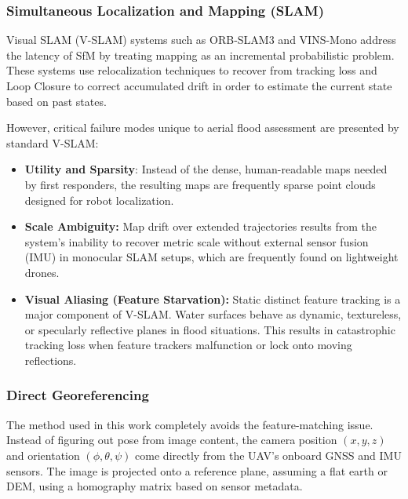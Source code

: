 \documentclass[conference]{IEEEtran}
\begin{document}
\subsubsection{Simultaneous Localization and Mapping (SLAM)}
Visual SLAM (V-SLAM) systems such as ORB-SLAM3\cite{orbslam3} and VINS-Mono\cite{vinsmono} address the latency of SfM by treating mapping as an incremental probabilistic problem. These systems use relocalization techniques to recover from tracking loss and Loop Closure to correct accumulated drift in order to estimate the current state based on past states.

However, critical failure modes unique to aerial flood assessment are presented by standard V-SLAM:
\begin{itemize} \item \textbf{Utility and Sparsity}: Instead of the dense, human-readable maps needed by first responders, the resulting maps are frequently sparse point clouds designed for robot localization.
    \item \textbf{Scale Ambiguity:} Map drift over extended trajectories results from the system's inability to recover metric scale without external sensor fusion (IMU) in monocular SLAM setups, which are frequently found on lightweight drones.
    \item \textbf{Visual Aliasing (Feature Starvation):} Static distinct feature tracking is a major component of V-SLAM. Water surfaces behave as dynamic, textureless, or specularly reflective planes in flood situations. This results in catastrophic tracking loss when feature trackers malfunction or lock onto moving reflections.
\end{itemize}

\subsubsection{Direct Georeferencing}
The method used in this work completely avoids the feature-matching issue. Instead of figuring out pose from image content, the camera position $(x, y, z)$ and orientation $(\phi, \theta, \psi)$ come directly from the UAV's onboard GNSS and IMU sensors. The image is projected onto a reference plane, assuming a flat earth or DEM, using a homography matrix based on sensor metadata.
\end{document}
